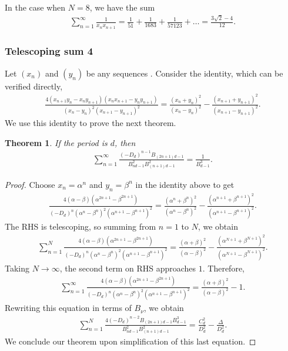 \documentclass[12pt]{article}
\theoremstyle{plain}
\newtheorem{theorem}{Theorem}
\theoremstyle{definition}
\theoremstyle{remark}
\begin{document}
In the case when $ N = 8 $, we have the sum
\begin{align*}
	\sum_{n = 1}^\infty \frac{1}{x_n x_{n + 1}} = \frac{1}{51} + \frac{1}{1683} + \frac{1}{57123} + \ldots = \frac{3\sqrt{2} - 4}{12}.
\end{align*}

\subsubsection{Telescoping sum 4}

Let $ (x_n) $ and $ (y_n) $ be any sequences . Consider the identity, which can be verified directly,
\begin{align*}
	\frac{4(x_{n + 1} y_n - x_n y_{n + 1})(x_n x_{n + 1} - y_n y_{n + 1})}{(x_n - y_n)^2 (x_{n + 1} - y_{n + 1})^2} = \frac{(x_n + y_n)^2}{(x_n - y_n)^2} - \frac{(x_{n + 1} + y_{n + 1})^2}{(x_{n + 1} - y_{n + 1})^2}.
\end{align*}
We use this identity to prove the next theorem.
\begin{theorem}  If the period is $ d $, then
\begin{align*}
	\sum_{n = 1}^\infty \frac{(-D_d)^{n - 1} B_{(2n + 1)d - 1}}{B_{nd - 1}^2 B_{(n + 1)d - 1}^2} = \frac{1}{B_{d - 1}^3}.
\end{align*}
\end{theorem}

\begin{proof}
Choose $ x_n = \alpha^n $ and $ y_n = \beta^n $ in the identity above to get
\begin{align*}
	\frac{4(\alpha - \beta)(\alpha^{2n + 1} - \beta^{2n + 1})}{(-D_d)^n (\alpha^n - \beta^n)^2 (\alpha^{n + 1} - \beta^{n + 1})^2} = \frac{(\alpha^n + \beta^n)^2}{(\alpha^n - \beta^n)^2} - \frac{(\alpha^{n + 1} + \beta^{n + 1})^2}{(\alpha^{n + 1} - \beta^{n + 1})^2}.
\end{align*}
The RHS is telescoping, so summing from $ n = 1 $ to $ N $, we obtain
\begin{align*}
	\sum_{n = 1}^N \frac{4(\alpha - \beta)(\alpha^{2n + 1} - \beta^{2n + 1})}{(-D_d)^n (\alpha^n - \beta^n)^2 (\alpha^{n + 1} - \beta^{n + 1})^2} = \frac{(\alpha + \beta)^2}{(\alpha - \beta)^2} - \frac{(\alpha^{N + 1} + \beta^{N + 1})^2}{(\alpha^{N + 1} - \beta^{N + 1})^2}.
\end{align*}
Taking $ N \longrightarrow \infty $, the second term on RHS approaches $ 1 $. Therefore,
\begin{align*}
	\sum_{n = 1}^\infty \frac{4(\alpha - \beta)(\alpha^{2n + 1} - \beta^{2n + 1})}{(-D_d)^n (\alpha^n - \beta^n)^2 (\alpha^{n + 1} - \beta^{n + 1})^2} = \frac{(\alpha + \beta)^2}{(\alpha - \beta)^2} - 1.
\end{align*}
Rewriting this equation in terms of $ B_\nu $, we obtain
\begin{align*}
	\sum_{n = 1}^N \frac{4(-D_d)^{n - 2} B_{(2n + 1)d - 1} B_{d - 1}^3}{B_{nd - 1}^2 B_{(n + 1)d - 1}^2} = \frac{C_d^2}{D_d^2} - \frac{\Delta}{D_d^2}.
\end{align*}
We conclude our theorem upon simplification of this last equation. 
\end{proof}
\end{document}
